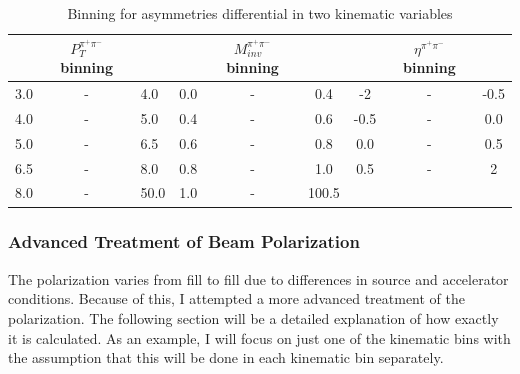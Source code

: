 \documentclass[letterpaper, abstract = on,listof=totoc, bibliography=totoc]{scrreprt}
\newcommand{\ptpair}{P_{T}^{\pi^+\pi^-}}
\newcommand{\mpair}{M_{inv}^{\pi^+\pi^-}}
\newcommand{\etapair}{\eta^{\pi^+\pi^-}}
\begin{document}
\begin{center}
\begin{table}[h!]
\caption{Binning for asymmetries differential in two kinematic variables}
\begin{tabular}{r c l | c c c | c c c } 
\\
 & $\ptpair$ binning &  & & $\mpair$ binning & & & $\etapair$ binning &	\\ \hline
3.0 & - & 4.0 & 0.0 & - & 0.4 & -2 & - & -0.5 \\		
4.0 & - & 5.0 & 0.4 & - & 0.6 & -0.5 & - & 0.0 \\
5.0 & - & 6.5 &0.6 & - & 0.8 & 0.0 & - & 0.5 \\
6.5 & - & 8.0 & 0.8 & - & 1.0 & 0.5 & - & 2\\
8.0 & - & 50.0 & 1.0 & - & 100.5 &	\\
\end{tabular}
\label{tab:2dbinning}
\end{table}
\end{center}



\subsubsection{Advanced Treatment of Beam Polarization}

The polarization varies from fill to fill due to differences in source and accelerator conditions.
Because of this, I attempted a more advanced treatment of the polarization. The following section will be a detailed explanation of how exactly it is calculated. As an example, I will focus on just one of the kinematic bins with the assumption that this will be done in each kinematic bin separately. 
\end{document}
